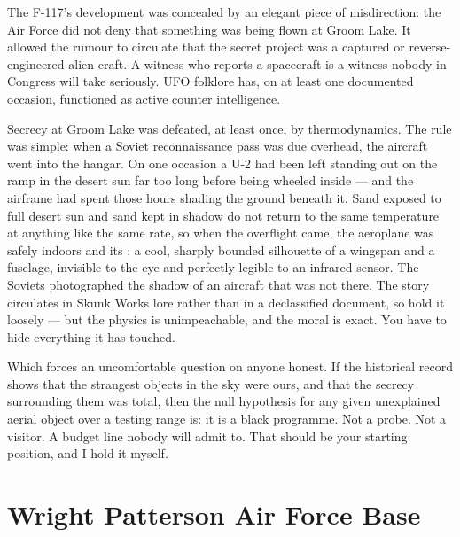 \begin{funfact}
The F-117's development was concealed by an elegant piece of misdirection: the Air Force
did not deny that something was being flown at Groom Lake. It allowed the rumour to
circulate that the secret project was a captured or reverse-engineered alien craft. A
witness who reports a spacecraft is a witness nobody in Congress will take seriously.
UFO folklore has, on at least one documented occasion, functioned as active counter
intelligence.
\end{funfact}

\begin{funfact}
Secrecy at Groom Lake was defeated, at least once, by thermodynamics. The rule was simple: when a
Soviet reconnaissance pass was due overhead, the aircraft went into the hangar. On one occasion a
U-2 had been left standing out on the ramp in the desert sun far too long before being wheeled
inside --- and the airframe had spent those hours shading the ground beneath it. Sand exposed to
full desert sun and sand kept in shadow do not return to the same temperature at anything like the
same rate, so when the overflight came, the aeroplane was safely indoors and its
: a cool, sharply bounded silhouette of a wingspan and a
fuselage, invisible to the eye and perfectly legible to an infrared sensor. The Soviets
photographed the shadow of an aircraft that was not there. The story circulates in Skunk Works
lore rather than in a declassified document, so hold it loosely --- but the physics is
unimpeachable, and the moral is exact.  You
have to hide everything it has touched.
\end{funfact}

Which forces an uncomfortable question on anyone honest. If the historical record shows
that the strangest objects in the sky were ours, and that the secrecy surrounding them was
total, then the null hypothesis for any given unexplained aerial object over a testing
range is: it is a black programme. Not a probe. Not a visitor. A budget line nobody will
admit to. That should be your starting position, and I hold it myself.

\section{Wright Patterson Air Force Base}\label{sec:wrightpattersonairforceb}

